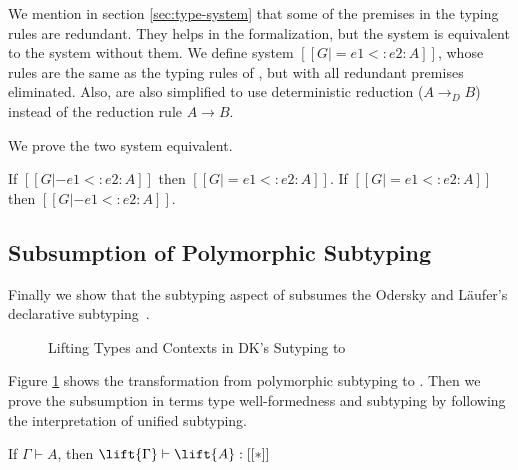 We mention in section \ref{sec:type-system} that some of the premises in the
typing rules are redundant. They helps in the formalization, but the system
is equivalent to the system without them. We define system
$[[G |= e1 <: e2 : A]]$, whose rules are the same as the typing rules of \name
, but with all redundant premises eliminated. Also, 
are also simplified to use deterministic reduction ($A \longrightarrow_D B$)
instead of the reduction rule $A \longrightarrow B$.

We prove the two system equivalent.

\begin{theorem}
  If $[[G |- e1 <: e2 : A]]$ then $[[G |= e1 <: e2 : A]]$.
  If $[[G |= e1 <: e2 : A]]$ then $[[G |- e1 <: e2 : A]]$.
\end{theorem}

\subsection{Subsumption of Polymorphic Subtyping}

Finally we show that the subtyping aspect of \name subsumes the Odersky and L\"aufer's declarative
subtyping~\cite{??}.

\begin{figure}
    \caption{Lifting Types and Contexts in DK's Sutyping to \name}
    \label{fig:lift}
\end{figure}

Figure \ref{fig:lift} shows the transformation from polymorphic subtyping to \name.
Then we prove the subsumption in terms type well-formedness and subtyping
by following the interpretation of unified subtyping.

\begin{theorem}
    If $\Gamma \vdash A$, then $\lift{\Gamma} \vdash \lift{A} : [[*]]$
\end{theorem}

